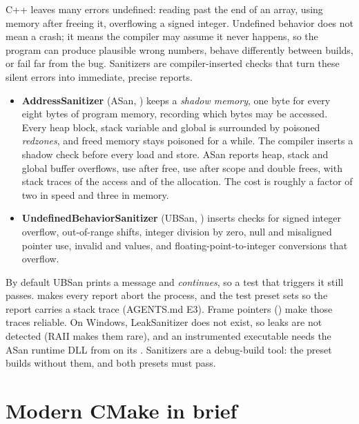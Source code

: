 C++ leaves many errors undefined: reading past the end of an array, using memory after freeing it, overflowing a signed integer. Undefined
behavior does not mean a crash; it means the compiler may assume it never happens, so the program can produce plausible wrong numbers, behave
differently between builds, or fail far from the bug. Sanitizers are compiler-inserted checks that turn these silent errors into immediate,
precise reports.
\begin{itemize}
  \item \textbf{AddressSanitizer} (ASan, ) keeps a \emph{shadow memory}, one byte for every eight bytes of program memory,
        recording which bytes may be accessed. Every heap block, stack variable and global is surrounded by poisoned \emph{redzones}, and freed
        memory stays poisoned for a while. The compiler inserts a shadow check before every load and store. ASan reports heap, stack and
        global buffer overflows, use after free, use after scope and double frees, with stack traces of the access and of the allocation. The
        cost is roughly a factor of two in speed and three in memory.
  \item \textbf{UndefinedBehaviorSanitizer} (UBSan, ) inserts checks for signed integer overflow, out-of-range shifts, integer
        division by zero, null and misaligned pointer use, invalid  and  values, and floating-point-to-integer conversions that
        overflow.
\end{itemize}
By default UBSan prints a message and \emph{continues}, so a test that triggers it still passes.  makes every report
abort the process, and the test preset sets  so the report carries a stack trace
(AGENTS.md E3). Frame pointers () make those traces reliable. On Windows, LeakSanitizer does not exist, so leaks are
not detected (RAII makes them rare), and an instrumented executable needs the ASan runtime DLL from 
on its . Sanitizers are a debug-build tool: the  preset builds without them, and both presets must pass.

\section{Modern CMake in brief}
\label{sec:cmake}

